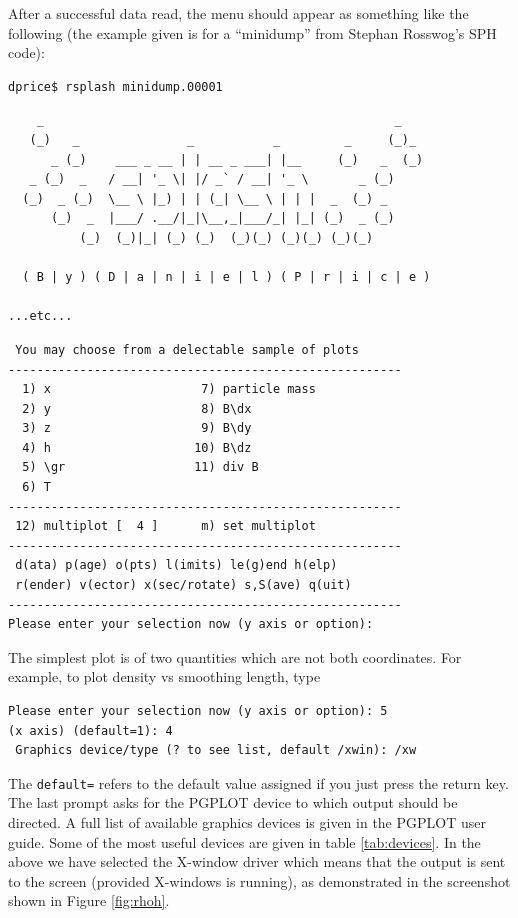 \documentclass[a4paper,10pt]{article}
\begin{document}
After a successful data read, the menu should appear as something like the
following (the example given is for a ``minidump'' from Stephan Rosswog's SPH code):
\begin{verbatim}
dprice$ rsplash minidump.00001 
\end{verbatim}
\begin{verbatim}
    _                                                 _  
   (_)   _               _           _         _     (_)_
      _ (_)    ___ _ __ | | __ _ ___| |__     (_)   _  (_)
   _ (_)  _   / __| '_ \| |/ _` / __| '_ \       _ (_)    
  (_)  _ (_)  \__ \ |_) | | (_| \__ \ | | |  _  (_) _    
      (_)  _  |___/ .__/|_|\__,_|___/_| |_| (_)  _ (_)   
          (_)  (_)|_| (_) (_)  (_)(_) (_)(_) (_)(_)     

  ( B | y ) ( D | a | n | i | e | l ) ( P | r | i | c | e )

...etc...
\end{verbatim}
\begin{verbatim}
 You may choose from a delectable sample of plots 
-------------------------------------------------------
  1) x                     7) particle mass       
  2) y                     8) B\dx                
  3) z                     9) B\dy                
  4) h                    10) B\dz                
  5) \gr                  11) div B               
  6) T                   
-------------------------------------------------------
 12) multiplot [  4 ]      m) set multiplot 
-------------------------------------------------------
 d(ata) p(age) o(pts) l(imits) le(g)end h(elp)
 r(ender) v(ector) x(sec/rotate) s,S(ave) q(uit)
-------------------------------------------------------
Please enter your selection now (y axis or option):
\end{verbatim}
The simplest plot is of two quantities which are not both coordinates. For
example, to plot density vs smoothing length, type
\begin{verbatim}
Please enter your selection now (y axis or option): 5
(x axis) (default=1): 4
 Graphics device/type (? to see list, default /xwin): /xw
\end{verbatim}
 The \verb+default=+ refers to the default value assigned if you just press the return key. The last prompt asks for the PGPLOT device to which output should be directed. A full list of available graphics devices is given in the PGPLOT user guide. Some of the most useful devices are given in table \ref{tab:devices}. In the
above we have selected the X-window driver which means that the output is sent to the
screen (provided X-windows is running), as demonstrated in the screenshot shown in Figure \ref{fig:rhoh}. 
\end{document}

